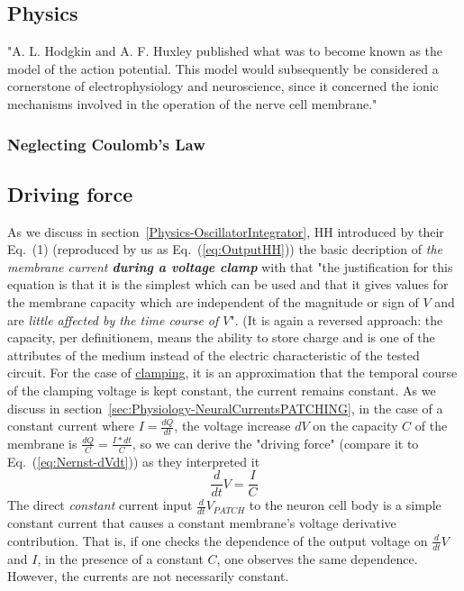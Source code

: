 \subsection{Physics\label{Physiology-HHPhysics}}

"A. L. Hodgkin and A. F. Huxley published what was to become known as the
model of the action potential. This model would subsequently be considered a cornerstone of
electrophysiology and neuroscience, since it concerned the ionic mechanisms involved in the
operation of the nerve cell membrane."~\cite{PhysicsForHodgkinHuxley:2024}




\subsubsection{Neglecting Coulomb's Law\label{Physiology-HHNeglectingCoulomb}}


\subsection{Driving force\label{sec:Physiology-HHDrivingForce}}


As we discuss in section~\ref{Physics-OscillatorIntegrator}, HH introduced 
by their Eq.~(1) (reproduced by us as Eq.~(\ref{eq:OutputHH}))
the basic decription of \textit{the membrane current \textbf{during a voltage clamp}} with that 
"the justification for this equation is that it is the simplest which can be used
and that it gives values for the membrane capacity which are independent of
the magnitude or sign of $V$ and are \textit{little affected by the time course of $V$}".
(It is again a reversed approach: the capacity, per definitionem, means the ability to store charge
and is one of the attributes of the medium instead of the electric characteristic
of the tested circuit. For the case of \hyperlink{voltage-clamping}{clamping}, it is an approximation
that the temporal course of the clamping voltage
is kept constant, the current remains constant.  
As we discuss in section~\ref{sec:Physiology-NeuralCurrentsPATCHING},
in the case of a constant current where $I=\frac{dQ}{dt}$,  the voltage increase $dV$
on the capacity $C$ of the membrane is $\frac{dQ}{C}=\frac{I*dt}{C}$,
so we can derive the "driving force" (compare it to Eq.~(\ref{eq:Nernst-dVdt}))
as they interpreted it
%
\[\frac{d}{dt} V=\frac{I}{C}\label{eq:Physiology-HHDrivingForce}\]
%
The direct \textit{constant} current input $\frac{d}{dt} V_{PATCH}$
to the neuron cell body is a simple constant current that causes a constant membrane's voltage derivative contribution.
That is, if one checks the dependence of the output voltage on $\frac{d}{dt} V$ and $I$, in the presence of a constant $C$,
one observes the same dependence.
However, the currents are not necessarily constant.



